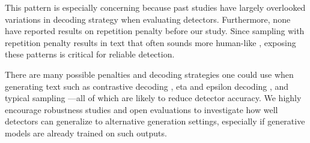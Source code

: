 \documentclass[11pt]{article}
\begin{document}
This pattern is especially concerning because past studies have largely overlooked variations in decoding strategy when evaluating detectors. Furthermore, none have reported results on repetition penalty before our study. Since sampling with repetition penalty results in text that often sounds more human-like \citep{keskar2019ctrl}, exposing these patterns is critical for reliable detection. 

There are many possible penalties and decoding strategies one could use when generating text such as contrastive decoding \citep{li-etal-2023-contrastive}, eta and epsilon decoding \citep{hewitt-etal-2022-truncation}, and typical sampling \citep{meister-etal-2023-locally}---all of which are likely to reduce detector accuracy. We highly encourage robustness studies and open evaluations to investigate how well detectors can generalize to alternative generation settings, especially if generative models are already trained on such outputs.
\end{document}
